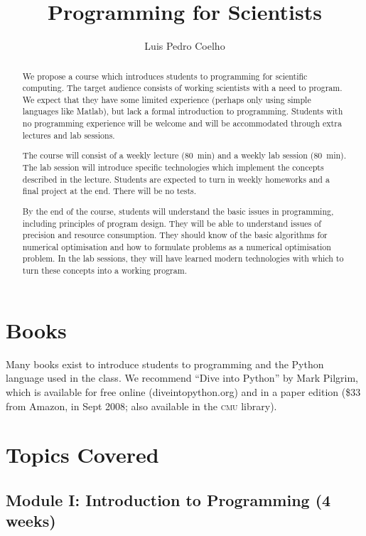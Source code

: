 \documentclass{article}
\title{Programming for Scientists}
\author{Luis Pedro Coelho}
\begin{document}
\maketitle

\begin{abstract}
We propose a course which introduces students to programming for scientific computing. The target audience consists of working scientists with a need to program. We expect that they have some limited experience (perhaps only using simple languages like Matlab), but lack a formal introduction to programming. Students with no programming experience will be welcome and will be accommodated through extra lectures and lab sessions.

The course will consist of a weekly lecture (80~min) and a weekly lab session (80~min). The lab session will introduce specific technologies which implement the concepts described in the lecture. Students are expected to turn in weekly homeworks and a final project at the end. There will be no tests.

By the end of the course, students will understand the basic issues in programming, including principles of program design. They will be able to understand issues of precision and resource consumption. They should know of the basic algorithms for numerical optimisation and how to formulate problems as a numerical optimisation problem. In the lab sessions, they will have learned modern technologies with which to turn these concepts into a working program.
\end{abstract}

\section{Books}

Many books exist to introduce students to programming and the Python language used in the class. We recommend ``Dive into Python'' by Mark Pilgrim, which is available for free online (diveintopython.org) and in a paper edition (\$33 from Amazon, in Sept 2008; also available in the \textsc{cmu} library).

\section{Topics Covered}

\subsection{Module I: Introduction to Programming (4 weeks)}
\end{document}

